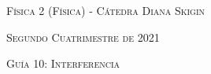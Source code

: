 \documentclass[11pt,spanish]{article}
\begin{document}
    \begin{center}
    \textsc{\large Física 2 (Física) - Cátedra Diana Skigin}
    \par\end{center}{\large \par}
    
    \begin{center}
    \textsc{\large Segundo Cuatrimestre de 2021}
    \par\end{center}{\large \par}
    
    \begin{center}
    \textsc{\large Guía 10: Interferencia}
    \par\end{center}{\large \par}
\end{document}

